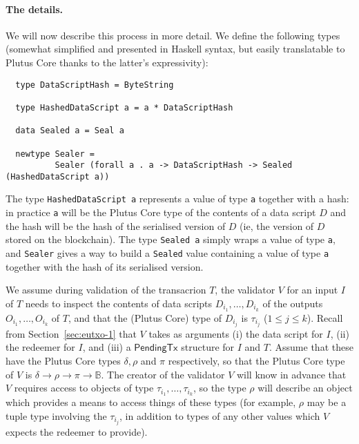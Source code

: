 \documentclass[a4paper]{article}
\newcommand{\s}{\textsf}  %
\newcommand{\ptx}{\ensuremath{\s{PendingTx}}}
\newcommand\B{\ensuremath{\mathbb{B}}}
\begin{document}
\paragraph{The details.} We will now describe this process in more
detail.  We define the following types (somewhat simplified and
presented in Haskell syntax, but easily translatable to Plutus Core
thanks to the latter's expressivity):

\begin{verbatim}
  type DataScriptHash = ByteString

  type HashedDataScript a = a * DataScriptHash

  data Sealed a = Seal a

  newtype Sealer = 
          Sealer (forall a . a -> DataScriptHash -> Sealed (HashedDataScript a))
\end{verbatim}

\noindent The type \verb|HashedDataScript a| represents a value of
type \verb|a| together with a hash: in practice \verb|a| will be the
Plutus Core type of the contents of a data script $D$ and the hash
will be the hash of the serialised version of $D$ (ie, the version of
$D$ stored on the blockchain).  The type \verb|Sealed a| simply wraps
a value of type \verb|a|, and \verb|Sealer| gives a way to build a
\verb|Sealed| value containing a value of type \verb|a| together with
the hash of its serialised version.

We assume during validation of the transacrion $T$, the validator $V$
for an input $I$ of $T$ needs to inspect the contents of data scripts
$D_{i_1}, \ldots, D_{i_k}$ of the outputs $O_{i_1}, \ldots, O_{i_k}$
of $T$, and that the (Plutus Core) type of $D_{i_j}$ is $\tau_{i_j}$
($1\le j \le k$).  Recall from Section~\ref{sec:eutxo-1} that $V$
takes as arguments (i) the data script for $I$, (ii) the redeemer for
$I$, and (iii) a $\ptx$ structure for $I$ and $T$.  Assume that these
have the Plutus Core types $\delta, \rho$ and $\pi$ respectively, so
that the Plutus Core type of $V$ is
$\delta \rightarrow \rho \rightarrow \pi \rightarrow \B$.  The creator
of the validator $V$ will know in advance that $V$ requires access to
objects of type $\tau_{i_1}, \ldots, \tau_{i_k}$, so the type $\rho$
will describe an object which provides a means to access things of
these types (for example, $\rho$ may be a tuple type involving the
$\tau_{i_j}$, in addition to types of any other values which $V$
expects the redeemer to provide).

\newcommand{\sealed}{\mathsf{Sealed}}
\newcommand{\sealer}{\mathsf{Sealer}}
\end{document}
